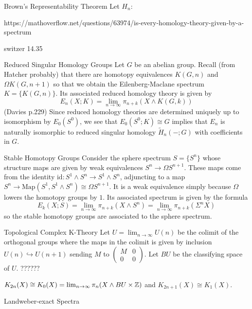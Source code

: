 \documentclass[a4paper]{article}
\begin{document}
\begin{thm}{Brown's Representability Theorem}{} Let $H_n:$
\end{thm}

https://mathoverflow.net/questions/63974/is-every-homology-theory-given-by-a-spectrum

switzer 14.35

\begin{eg}{Reduced Singular Homology Groups}{} Let $G$ be an abelian group. Recall (from Hatcher probably) that there are homotopy equivalences $K(G,n)$ and $\Omega K(G,n+1)$ so that we obtain the Eilenberg-Maclane spectrum $K=\{K(G,n)\}$. Its associated reduced homology theory is given by $$E_n(X;K)=\lim_{n\to\infty}\pi_{n+k}(X\wedge K(G,k))$$ (Davies p.229) Since reduced homology theories are determined uniquely up to isomorphism by $E_0(S^0)$, we see that $E_0(S^0;K)\cong G$ implies that $E_n$ is naturally isomorphic to reduced singular homology $\widetilde{H}_n(-;G)$ with coefficients in $G$. 
\end{eg}

\begin{eg}{Stable Homotopy Groups}{} Consider the sphere spectrum $S=\{S^n\}$ whose structure maps are given by weak equivalences $S^n\to\Omega S^{n+1}$. These maps come from the identity $\text{id}:S^1\wedge S^n\to S^1\wedge S^n$, adjuncting to a map $S^n\to\text{Map}(S^1,S^1\wedge S^n)\cong\Omega S^{n+1}$. It is a weak equivalence simply because $\Omega$ lowers the homotopy groups by $1$. Its associated spectrum is given by the formula $$E_k(X;S)=\lim_{n\to\infty}\pi_{n+k}(X\wedge S^n)=\lim_{n\to\infty}\pi_{n+k}(\Sigma^nX)$$ so the stable homotopy groups are associated to the sphere spectrum. 
\end{eg}

\begin{eg}{Topological Complex K-Theory}{} Let $U=\lim_{n\to\infty}U(n)$ be the colimit of the orthogonal groups where the maps in the colimit is given by inclusion $U(n)\hookrightarrow U(n+1)$ sending $M$ to $\begin{pmatrix}
M & 0\\ 0 & 0
\end{pmatrix}$. Let $BU$ be the classifying space of $U$. ??????

$K_{2n}(X)\cong K_0(X)=\lim_{n\to\infty}\pi_n(X\wedge BU\times\mathbb{Z})$ and $K_{2n+1}(X)\cong K_1(X)$. 
\end{eg}

\begin{eg}{Landweber-exact Spectra}{}
\end{eg}
\end{document}
